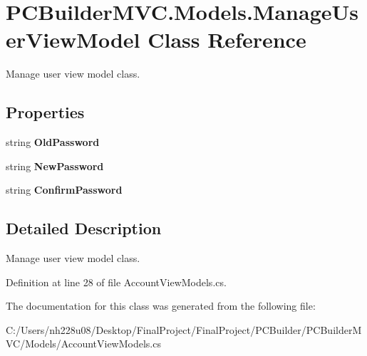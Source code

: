 \hypertarget{class_p_c_builder_m_v_c_1_1_models_1_1_manage_user_view_model}{}\section{P\+C\+Builder\+M\+V\+C.\+Models.\+Manage\+User\+View\+Model Class Reference}
\label{class_p_c_builder_m_v_c_1_1_models_1_1_manage_user_view_model}


Manage user view model class.  


\subsection*{Properties}
\begin{DoxyCompactItemize}
\item 
string {\bfseries Old\+Password}\hypertarget{class_p_c_builder_m_v_c_1_1_models_1_1_manage_user_view_model_a9a55784e2c4f3e7537dabf88d626c1e7}{}\label{class_p_c_builder_m_v_c_1_1_models_1_1_manage_user_view_model_a9a55784e2c4f3e7537dabf88d626c1e7}

\item 
string {\bfseries New\+Password}\hypertarget{class_p_c_builder_m_v_c_1_1_models_1_1_manage_user_view_model_a818cb3dd29aab015a286f266291353fb}{}\label{class_p_c_builder_m_v_c_1_1_models_1_1_manage_user_view_model_a818cb3dd29aab015a286f266291353fb}

\item 
string {\bfseries Confirm\+Password}\hypertarget{class_p_c_builder_m_v_c_1_1_models_1_1_manage_user_view_model_a9e97c0277c429b0c9dd96b3e8ffc46c0}{}\label{class_p_c_builder_m_v_c_1_1_models_1_1_manage_user_view_model_a9e97c0277c429b0c9dd96b3e8ffc46c0}

\end{DoxyCompactItemize}


\subsection{Detailed Description}
Manage user view model class. 



Definition at line 28 of file Account\+View\+Models.\+cs.



The documentation for this class was generated from the following file\+:\begin{DoxyCompactItemize}
\item 
C\+:/\+Users/nh228u08/\+Desktop/\+Final\+Project/\+Final\+Project/\+P\+C\+Builder/\+P\+C\+Builder\+M\+V\+C/\+Models/Account\+View\+Models.\+cs\end{DoxyCompactItemize}
